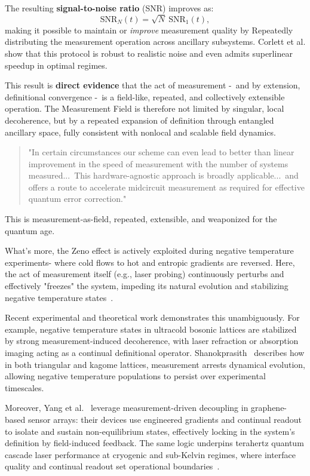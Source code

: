 The resulting \textbf{signal-to-noise ratio} (SNR) improves as:
\begin{equation}
\mathrm{SNR}_N(t) = \sqrt{N}\ \mathrm{SNR}_1(t),
\end{equation}
making it possible to maintain or \emph{improve} measurement quality by Repeatedly distributing the measurement operation across ancillary subsystems. Corlett et al. show that this protocol is robust to realistic noise and even admits superlinear speedup in optimal regimes.

This result is \textbf{direct evidence} that the act of measurement - and by extension, definitional convergence - is a field-like, repeated, and collectively extensible operation. The Measurement Field is therefore not limited by singular, local decoherence, but by a repeated expansion of definition through entangled ancillary space, fully consistent with nonlocal and scalable field dynamics.

\begin{quote}
"In certain circumstances our scheme can even lead to better than linear improvement in the speed of measurement with the number of systems measured... This hardware-agnostic approach is broadly applicable... and offers a route to accelerate midcircuit measurement as required for effective quantum error correction."~\cite{corlett_speeding_2025}
\end{quote}

This is measurement-as-field, repeated, extensible, and weaponized for the quantum age.

What's more, the Zeno effect is actively exploited during negative temperature experiments- where cold flows to hot and entropic gradients are reversed. Here, the act of measurement itself (e.g., laser probing) continuously perturbs and effectively "freezes" the system, impeding its natural evolution and stabilizing negative temperature states~\cite{shanokprasith_2024}. 

Recent experimental and theoretical work demonstrates this unambiguously. For example, negative temperature states in ultracold bosonic lattices are stabilized by strong measurement-induced decoherence, with laser refraction or absorption imaging acting as a continual definitional operator. Shanokprasith~\cite{shanokprasith_2024} describes how in both triangular and kagome lattices, measurement arrests dynamical evolution, allowing negative temperature populations to persist over experimental timescales.

Moreover, Yang et al.~\cite{yang2025} leverage measurement-driven decoupling in graphene-based sensor arrays: their devices use engineered gradients and continual readout to isolate and sustain non-equilibrium states, effectively locking in the system's definition by field-induced feedback. The same logic underpins terahertz quantum cascade laser performance at cryogenic and sub-Kelvin regimes, where interface quality and continual readout set operational boundaries~\cite{lander_gower_exploring_2024}.

